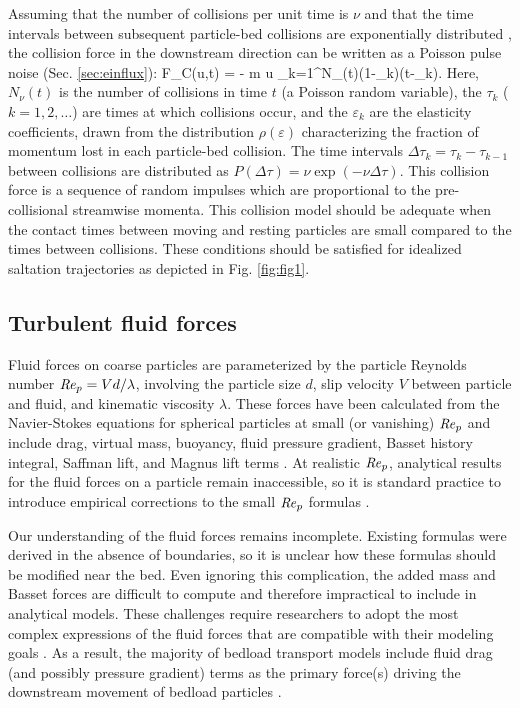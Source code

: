 Assuming that the number of collisions per unit time is $\nu$ and that the time intervals between subsequent particle-bed collisions are exponentially distributed \citep[e.g.][]{Gordon1972}, the collision force in the downstream direction can be written as a Poisson pulse noise (Sec. \ref{sec:einflux}):
\be F_C(u,t) = - m u \sum_{k=1}^{N_\nu(t)}(1-\varepsilon_k)\delta(t-\tau_k). \label{eq:col} \ee
Here, $N_\nu(t)$ is the number of collisions in time $t$ (a Poisson random variable), the $\tau_k$ ($k=1,2,\dots$) are times at which collisions occur, and the $\varepsilon_k$ are the elasticity coefficients, drawn from the distribution $\rho(\varepsilon)$ characterizing the fraction of momentum lost in each particle-bed collision.
The time intervals $\Delta \tau_k = \tau_k-\tau_{k-1}$ between collisions are distributed as $P(\Delta \tau) = \nu \exp(-\nu\Delta \tau).$
This collision force is a sequence of random impulses which are proportional to the pre-collisional streamwise momenta. This collision model should be adequate when the contact times between moving and resting particles are small compared to the times between collisions. These conditions should be satisfied for idealized saltation trajectories as depicted in Fig. \ref{fig:fig1}.

\subsection{Turbulent fluid forces}

Fluid forces on coarse particles are parameterized by the particle Reynolds number $\mbox{\textit{Re}}_p = V d/\lambda$, involving the particle size $d$, slip velocity $V$ between particle and fluid, and kinematic viscosity $\lambda$.
These forces have been calculated from the Navier-Stokes equations for spherical particles at small (or vanishing) $\mbox{\textit{Re}}_p$ and include drag, virtual mass, buoyancy, fluid pressure gradient, Basset history integral, Saffman lift, and Magnus lift terms \citep{Hjelmfelt1966, Maxey1983, Auton1987}.
At realistic $\mbox{\textit{Re}}_p$, analytical results for the fluid forces on a particle remain inaccessible, so it is standard practice to introduce empirical corrections to the small $\mbox{\textit{Re}}_p$ formulas \citep[e.g.][]{Clift1978,Schmeeckle2007}.

Our understanding of the fluid forces remains incomplete.
Existing formulas were derived in the absence of boundaries, so it is unclear how these formulas should be modified near the bed.
Even ignoring this complication, the added mass and Basset forces are difficult to compute and therefore impractical to include in analytical models.
These challenges require researchers to adopt the most complex expressions of the fluid forces that are compatible with their modeling goals \citep[e.g.][]{Michaelides1997,Armenio2001}.
As a result, the majority of bedload transport models include fluid drag (and possibly pressure gradient) terms as the primary force(s) driving the downstream movement of bedload particles \citep{Ancey2014,Fan2014,Schmeeckle2014,Gonzalez2017,Elghannay2017}.

